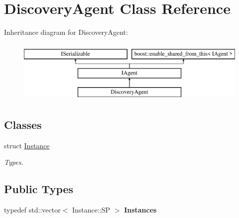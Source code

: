 \hypertarget{class_discovery_agent}{}\section{Discovery\+Agent Class Reference}
\label{class_discovery_agent}
Inheritance diagram for Discovery\+Agent\+:\begin{figure}[H]
\begin{center}
\leavevmode
\includegraphics[height=3.000000cm]{class_discovery_agent}
\end{center}
\end{figure}
\subsection*{Classes}
\begin{DoxyCompactItemize}
\item 
struct \hyperlink{struct_discovery_agent_1_1_instance}{Instance}
\begin{DoxyCompactList}\small\item\em Types. \end{DoxyCompactList}\end{DoxyCompactItemize}
\subsection*{Public Types}
\begin{DoxyCompactItemize}
\item 
\mbox{\label{class_discovery_agent_afa9e22368a2594a1d131c39047565387}} 
typedef std\+::vector$<$ Instance\+::\+SP $>$ {\bfseries Instances}
\end{DoxyCompactItemize}
